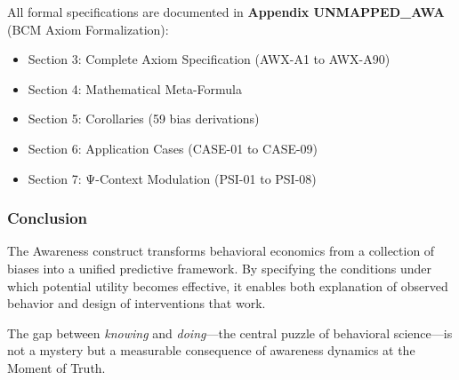 All formal specifications are documented in \textbf{Appendix UNMAPPED_AWA} 
(BCM Axiom Formalization):
\begin{itemize}
    \item Section 3: Complete Axiom Specification (AWX-A1 to AWX-A90)
    \item Section 4: Mathematical Meta-Formula
    \item Section 5: Corollaries (59 bias derivations)
    \item Section 6: Application Cases (CASE-01 to CASE-09)
    \item Section 7: Ψ-Context Modulation (PSI-01 to PSI-08)
\end{itemize}

\subsubsection{Conclusion}

The Awareness construct transforms behavioral economics from a collection 
of biases into a unified predictive framework. By specifying the conditions 
under which potential utility becomes effective, it enables both explanation 
of observed behavior and design of interventions that work.

The gap between \emph{knowing} and \emph{doing}—the central puzzle of 
behavioral science—is not a mystery but a measurable consequence of 
awareness dynamics at the Moment of Truth.
